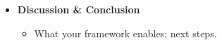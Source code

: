 \documentclass[
]{article}
\providecommand{\tightlist}{%
  \setlength{\itemsep}{0pt}\setlength{\parskip}{0pt}}
\begin{document}
\begin{itemize}
\begin{itemize}
    \begin{itemize}
    \tightlist
    \item
      engineering traceability improvements
    \item
      stakeholder feedback (if you have it)
    \item
      reduced ambiguity in documentation
    \item
      easier onboarding of new team members (if applicable)
    \end{itemize}
  \end{itemize}
\item
  \textbf{Discussion \& Conclusion}

  \begin{itemize}
  \tightlist
  \item
    What your framework enables; next steps.
  \end{itemize}
\end{itemize}
\end{document}
